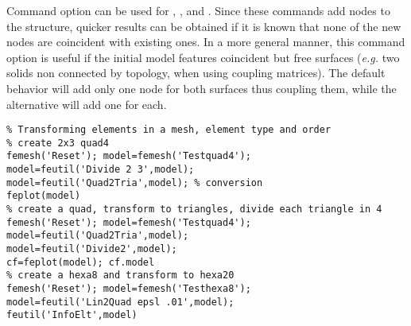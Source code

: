 Command option  can be used for , , and  . Since these commands add nodes to the structure, quicker results can be obtained if it is known that none of the new nodes are coincident with existing ones. In a more general manner, this command option is useful if the initial model features coincident but free surfaces ({\it e.g.} two solids non connected by topology, when using coupling matrices). The default behavior will add only one node for both surfaces thus coupling them, while the  alternative will add one for each.

\begin{verbatim}
% Transforming elements in a mesh, element type and order
% create 2x3 quad4 
femesh('Reset'); model=femesh('Testquad4'); 
model=feutil('Divide 2 3',model); 
model=feutil('Quad2Tria',model); % conversion
feplot(model)
% create a quad, transform to triangles, divide each triangle in 4
femesh('Reset'); model=femesh('Testquad4');
model=feutil('Quad2Tria',model);
model=feutil('Divide2',model);
cf=feplot(model); cf.model
% create a hexa8 and transform to hexa20
femesh('Reset'); model=femesh('Testhexa8');
model=feutil('Lin2Quad epsl .01',model);
feutil('InfoElt',model)
\end{verbatim}%



